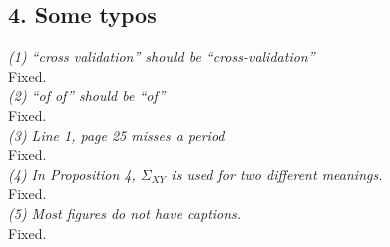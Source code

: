 \documentclass[11pt]{article}
\begin{document}
\subsection{4. Some typos}

\noindent
\emph{(1) ``cross validation'' should be ``cross-validation''}
\\

Fixed. \\

\noindent
\emph{(2) ``of of'' should be ``of''}
\\

Fixed. \\

\noindent
\emph{(3) Line 1, page 25 misses a period}
\\

Fixed. \\

\noindent
\emph{(4) In Proposition 4, $\Sigma_{XY}$ is used for two different meanings.}
\\

Fixed. \\

\noindent
\emph{(5) Most figures do not have captions.}
\\

Fixed.




\end{document}
